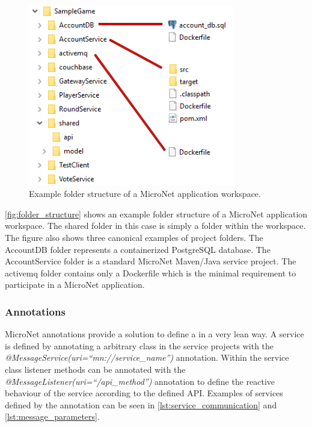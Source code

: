 \begin{figure}
	\centering
	\includegraphics[width=9cm]{images/tools/folder_structure}
	\caption{Example folder structure of a MicroNet application workspace.}
	\label{fig:folder_structure}
\end{figure}

\autoref{fig:folder_structure} shows an example folder structure of a MicroNet
application workspace. The shared folder in this case is simply a folder within the
workspace. The figure also shows three canonical examples of project folders.
The AccountDB folder represents a containerized PostgreSQL database. The
AccountService folder is a standard MicroNet Maven/Java service project. The
activemq folder contains only a Dockerfile which is the minimal requirement to
participate in a MicroNet application.

\subsubsection{Annotations}

MicroNet annotations provide a solution to define a \ms{} in a very lean way.
A service is defined by annotating a arbitrary class in the service projects
with the \textit{@MessageService(uri=``mn://service\_name'')} annotation. Within
the service class listener methods can be annotated with the
\textit{@MessageListener(uri=``/api\_method'')} annotation to define the
reactive behaviour of the service according to the defined API. Examples of
services defined by the annotation can be seen in
\autoref{lst:service_communication} and \autoref{lst:message_parameters}.


